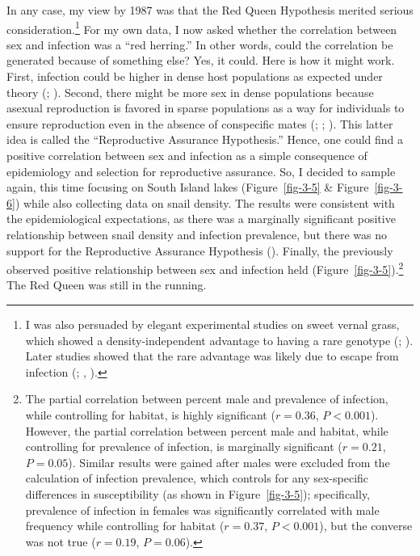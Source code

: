 \documentclass[
  letterpaper,
]{book}
\begin{document}
In any case, my view by 1987 was that the Red Queen Hypothesis merited
serious consideration.\footnote{I was also persuaded by elegant
  experimental studies on sweet vernal grass, which showed a
  density-independent advantage to having a rare genotype
  (;
  ). Later
  studies showed that the rare advantage was likely due to escape from
  infection (;
  , ).}
For my own data, I now asked whether the correlation between sex and
infection was a ``red herring.'' In other words, could the correlation
be generated because of something else? Yes, it could. Here is how it
might work. First, infection could be higher in dense host populations
as expected under theory (; ). Second, there
might be more sex in dense populations because asexual reproduction is
favored in sparse populations as a way for individuals to ensure
reproduction even in the absence of conspecific mates
(;
;
). This latter idea is
called the ``Reproductive Assurance Hypothesis.'' Hence, one could find
a positive correlation between sex and infection as a simple consequence
of epidemiology and selection for reproductive assurance. So, I decided
to sample again, this time focusing on South Island lakes
(Figure~\ref{fig-3-5} \& Figure~\ref{fig-3-6}) while also collecting
data on snail density. The results were consistent with the
epidemiological expectations, as there was a marginally significant
positive relationship between snail density and infection prevalence,
but there was no support for the Reproductive Assurance Hypothesis
(). Finally, the previously
observed positive relationship between sex and infection held
(Figure~\ref{fig-3-5}).\footnote{The partial correlation between percent
  male and prevalence of infection, while controlling for habitat, is
  highly significant (\(r = 0.36\), \(P < 0.001\)). However, the partial
  correlation between percent male and habitat, while controlling for
  prevalence of infection, is marginally significant (\(r = 0.21\),
  \(P = 0.05\)). Similar results were gained after males were excluded
  from the calculation of infection prevalence, which controls for any
  sex-specific differences in susceptibility (as shown in
  Figure~\ref{fig-3-5}); specifically, prevalence of infection in
  females was significantly correlated with male frequency while
  controlling for habitat (\(r = 0.37\), \(P < 0.001\)), but the
  converse was not true (\(r = 0.19\), \(P = 0.06\)).} The Red Queen was
still in the running.
\end{document}
